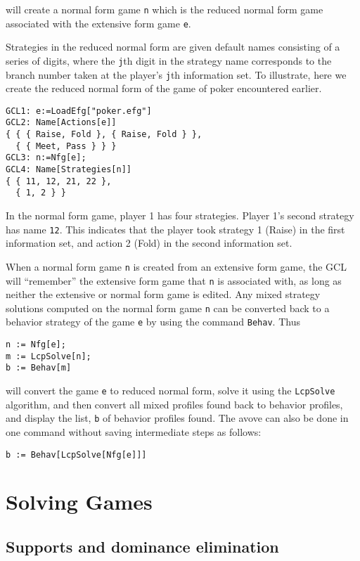 \noindent
will create a normal form game \verb+n+ which is the reduced normal
form game associated with the extensive form game \verb+e+.  

Strategies in the reduced normal form are given default names
consisting of a series of digits, where the \verb+j+th digit in the
strategy name corresponds to the branch number taken at the player's
\verb+j+th information set.  To illustrate, here we create the reduced
normal form of the game of poker encountered earlier.  

\begin{verbatim}
GCL1: e:=LoadEfg["poker.efg"]
GCL2: Name[Actions[e]]
{ { { Raise, Fold }, { Raise, Fold } },
  { { Meet, Pass } } }
GCL3: n:=Nfg[e];
GCL4: Name[Strategies[n]]
{ { 11, 12, 21, 22 },
  { 1, 2 } }
\end{verbatim}

In the normal form game, player 1 has four strategies.  Player 1's
second strategy has name \verb+12+.  This indicates that the player
took strategy 1 (Raise) in the first information set, and action 2
(Fold) in the second information set.  

When a normal form game \verb+n+ is created from an extensive form
game, the GCL will ``remember'' the extensive form game that \verb+n+
is associated with, as long as neither the extensive or normal form
game is edited.  Any mixed strategy solutions computed on the normal
form game \verb+n+ can be converted back to a behavior strategy of the
game \verb+e+ by using the command \verb+Behav+.  Thus

\begin{verbatim}
n := Nfg[e];
m := LcpSolve[n];
b := Behav[m]
\end{verbatim}

\noindent
will convert the game \verb+e+ to reduced normal form, solve it using
the \verb+LcpSolve+ algorithm, and then convert all mixed profiles found back
to behavior profiles, and display the list, \verb+b+ of behavior
profiles found. The avove can also be done in one command without saving
intermediate steps as follows:  
  
\begin{verbatim}
b := Behav[LcpSolve[Nfg[e]]]
\end{verbatim}

\chapter{Solving Games}

\section{Supports and dominance elimination}

